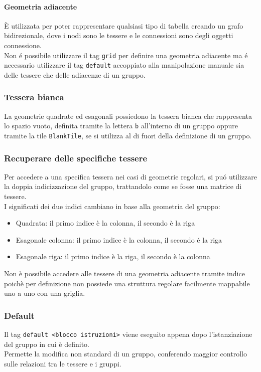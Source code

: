 \paragraph{Geometria adiacente}
È utilizzata per poter rappresentare qualsiasi tipo di tabella creando un grafo bidirezionale, dove
i nodi sono le tessere e le connessioni sono degli oggetti connessione. \\ 
Non é possibile utilizzare il tag \lstinline|grid| per definire una geometria adiacente ma é 
necessario utilizzare il tag \lstinline|default| accoppiato
alla manipolazione manuale sia delle tessere che delle adiacenze di un gruppo.

\subsubsection{Tessera bianca}
La geometrie quadrate ed esagonali possiedono la tessera bianca che rappresenta lo spazio vuoto, 
definita tramite la lettera \lstinline|b| all'interno di un gruppo oppure tramite la tile \lstinline{BlankTile},
se si utilizza al di fuori della definizione di un gruppo.  

\subsubsection{Recuperare delle specifiche tessere}
Per accedere a una specifica tessera nei casi di geometrie regolari, si puó utilizzare la doppia
indicizzazione del gruppo, trattandolo come se fosse una matrice di tessere. \\
I significati dei due indici cambiano in base alla geometria del gruppo:
\begin{itemize}
    \item Quadrata: il primo indice è la colonna, il secondo è la riga
    \item Esagonale colonna: il primo indice è la colonna, il secondo é la riga
    \item Esagonale riga: il primo indice è la riga, il secondo è la colonna
\end{itemize}
Non è possibile accedere alle tessere di una geometria adiacente tramite indice poichè per definizione
non possiede una struttura regolare facilmente mappabile uno a uno con una griglia. 

\subsubsection{Default}
Il tag \lstinline|default <blocco istruzioni>| viene eseguito appena dopo l'istanziazione 
del gruppo in cui è definito. \\
Permette la modifica non standard di un gruppo, conferendo maggior controllo sulle relazioni tra le tessere 
e i gruppi.

